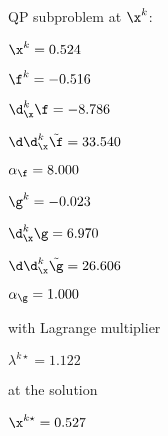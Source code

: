 QP subproblem at $\x^{k}$:

\bigskip
$\x^k=   0.524$


$\f^k =  -0.516$

$\d^k_{\x} \f =  -8.786$

$\d\d^k_{\x} \tilde \f =  33.540$

$\alpha_{\footnotesize\f} =   8.000$

\bigskip
$\g^k =  -0.023$

$\d^k_{\x}\g =   6.970$

$\d\d^k_{\x} \tilde \g =  26.606$

$\alpha_{\footnotesize\g} =   1.000$

\bigskip
with Lagrange multiplier

$\lambda^{k\star} =   1.122$

at the solution

$\x^{k\star} =   0.527$


